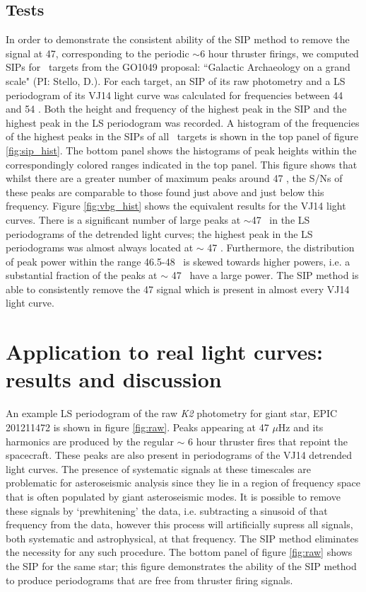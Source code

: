 \documentclass[useAMS, usenatbib, preprint, 12pt]{aastex}
\begin{document}
\subsection{Tests}

In order to demonstrate the consistent ability of the SIP method
to remove the signal at 47\uHz, corresponding to the periodic $\sim$6 hour
thruster firings, we computed SIPs for \nGO\ targets from the GO1049
proposal: ``Galactic Archaeology on a grand scale" (PI: Stello, D.).
For each target, an SIP of its raw photometry and a LS periodogram of its
VJ14 light curve was calculated for frequencies between
44 and 54 \uHz.
Both the height and frequency of the highest peak in the SIP and the highest
peak in the LS periodogram was recorded.
A histogram of the frequencies of the highest peaks in the SIPs of all \nGO\
targets is shown in the top panel of figure \ref{fig:sip_hist}.
The bottom panel shows the histograms of peak heights within the
correspondingly colored ranges indicated in the top panel.
This figure shows that whilst there are a greater number of maximum peaks
around 47 \uHz, the S/Ns of these peaks are comparable to those found just
above and just below this frequency.
Figure \ref{fig:vbg_hist} shows the equivalent results for the
VJ14 light curves.
There is a significant number of large peaks at $\sim$47 \uHz\ in the LS
periodograms of the detrended light curves; the highest peak in the LS
periodograms was almost always located at $\sim$ 47 \uHz.
Furthermore, the distribution of peak power within the range 46.5-48 \uHz\ is
skewed towards higher powers, i.e. a substantial fraction of the peaks at
$\sim$ 47 \uHz\ have a large power.
The SIP method is able to consistently remove the 47 \uHz signal which is
present in almost every VJ14 light curve.

\section{Application to real light curves: results and discussion}
\label{section:rotation}

An example LS periodogram of the raw {\it K2} photometry
for giant star, EPIC 201211472 is shown in figure \ref{fig:raw}.
Peaks appearing at 47 $\mu$Hz and its harmonics are produced by the regular
$\sim$ 6 hour thruster fires that repoint the spacecraft.
These peaks are also present in periodograms of the VJ14 detrended light
curves.
The presence of systematic signals at these timescales are problematic for
asteroseismic analysis since they lie in a region of frequency space
that is often populated by giant asteroseismic modes.
It is possible to remove these signals by `prewhitening' the data, i.e.
subtracting a sinusoid of that frequency from the data, however this process
will artificially supress all signals, both systematic and astrophysical, at
that frequency.
The SIP method eliminates the necessity for any such procedure.
The bottom panel of figure \ref{fig:raw} shows the SIP for the same star; this
figure demonstrates the ability of the SIP method to produce periodograms that
are free from thruster firing signals.
\end{document}
